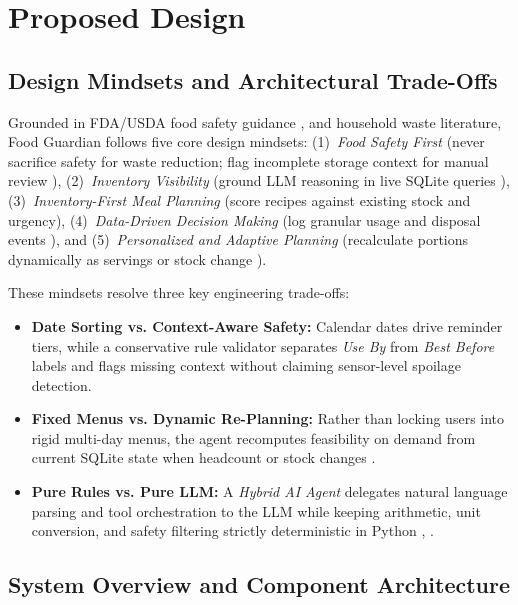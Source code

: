 \section{Proposed Design}
\label{sec:proposed_design}

\subsection{Design Mindsets and Architectural Trade-Offs}

Grounded in FDA/USDA food safety guidance \cite{ref2}, \cite{ref11} and household waste literature, Food Guardian follows five core design mindsets: (1)~\textit{Food Safety First} (never sacrifice safety for waste reduction; flag incomplete storage context for manual review \cite{ref8}), (2)~\textit{Inventory Visibility} (ground LLM reasoning in live SQLite queries \cite{ref7}), (3)~\textit{Inventory-First Meal Planning} (score recipes against existing stock and urgency), (4)~\textit{Data-Driven Decision Making} (log granular usage and disposal events \cite{ref10}), and (5)~\textit{Personalized and Adaptive Planning} (recalculate portions dynamically as servings or stock change \cite{ref7}).

These mindsets resolve three key engineering trade-offs:
\begin{itemize}
    \item \textbf{Date Sorting vs. Context-Aware Safety:} Calendar dates drive reminder tiers, while a conservative rule validator separates \textit{Use By} from \textit{Best Before} labels and flags missing context without claiming sensor-level spoilage detection.
    \item \textbf{Fixed Menus vs. Dynamic Re-Planning:} Rather than locking users into rigid multi-day menus, the agent recomputes feasibility on demand from current SQLite state when headcount or stock changes \cite{ref7}.
    \item \textbf{Pure Rules vs. Pure LLM:} A \textit{Hybrid AI Agent} delegates natural language parsing and tool orchestration to the LLM while keeping arithmetic, unit conversion, and safety filtering strictly deterministic in Python \cite{ref4}, \cite{ref5}.
\end{itemize}

\subsection{System Overview and Component Architecture}

